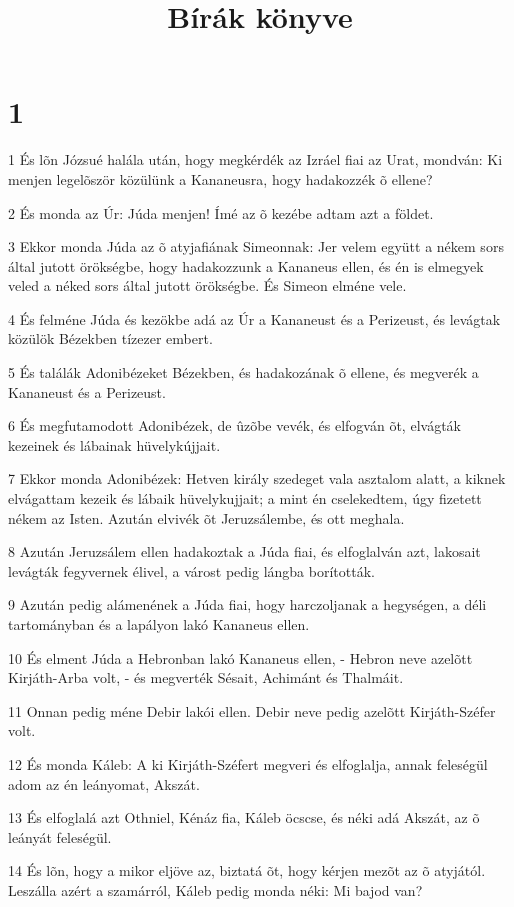 

\title{Bírák könyve}


\chapter{1}

\par 1 És lõn Józsué halála után, hogy megkérdék az Izráel fiai az Urat, mondván: Ki menjen legelõször közülünk a Kananeusra, hogy hadakozzék õ ellene?
\par 2 És monda az Úr: Júda menjen! Ímé az õ kezébe adtam azt a földet.
\par 3 Ekkor monda Júda az õ atyjafiának Simeonnak: Jer velem együtt a nékem sors által jutott örökségbe, hogy hadakozzunk a Kananeus ellen, és én is elmegyek veled a néked sors által jutott örökségbe. És Simeon elméne vele.
\par 4 És felméne Júda és kezökbe adá az Úr a Kananeust és a Perizeust, és levágtak közülök Bézekben tízezer embert.
\par 5 És találák Adonibézeket Bézekben, és hadakozának õ ellene, és megverék a Kananeust és a Perizeust.
\par 6 És megfutamodott Adonibézek, de ûzõbe vevék, és elfogván õt, elvágták kezeinek és lábainak hüvelykújjait.
\par 7 Ekkor monda Adonibézek: Hetven király szedeget vala asztalom alatt, a kiknek elvágattam kezeik és lábaik hüvelykujjait; a mint én cselekedtem, úgy fizetett nékem az Isten. Azután elvivék õt Jeruzsálembe, és ott meghala.
\par 8 Azután Jeruzsálem ellen hadakoztak a Júda fiai, és elfoglalván azt, lakosait levágták fegyvernek élivel, a várost pedig lángba borították.
\par 9 Azután pedig alámenének a Júda fiai, hogy harczoljanak a hegységen, a déli tartományban és a lapályon lakó Kananeus ellen.
\par 10 És elment Júda a Hebronban lakó Kananeus ellen, - Hebron neve azelõtt Kirjáth-Arba volt, - és megverték Sésait, Achimánt és Thalmáit.
\par 11 Onnan pedig méne Debir lakói ellen. Debir neve pedig azelõtt Kirjáth-Széfer volt.
\par 12 És monda Káleb: A ki Kirjáth-Széfert megveri és elfoglalja, annak feleségül adom az én leányomat, Akszát.
\par 13 És elfoglalá azt Othniel, Kénáz fia, Káleb öcscse, és néki adá Akszát, az õ leányát feleségül.
\par 14 És lõn, hogy a mikor eljöve az, biztatá õt, hogy kérjen mezõt az õ atyjától. Leszálla azért a szamárról, Káleb pedig monda néki: Mi bajod van?
